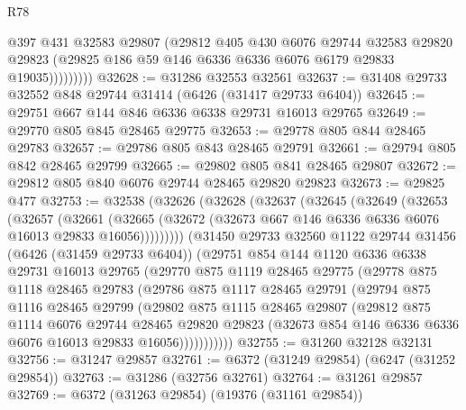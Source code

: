 \begin{lexlean}{R78}
\begin{coremodule}
                  @397
                  @431
                  @32583
                  @29807
                  (@29812
                    @405
                    @430
                    @6076
                    @29744
                    @32583
                    @29820
                    @29823
                    (@29825 @186 @59 @146 @6336 @6336 @6076 @6179 @29833 @19035)))))))))
@32628 := @31286 @32553 @32561
@32637 := @31408 @29733 @32552 @848 @29744 @31414 (@6426 (@31417 @29733 @6404))
@32645 := @29751 @667 @144 @846 @6336 @6338 @29731 @16013 @29765
@32649 := @29770 @805 @845 @28465 @29775
@32653 := @29778 @805 @844 @28465 @29783
@32657 := @29786 @805 @843 @28465 @29791
@32661 := @29794 @805 @842 @28465 @29799
@32665 := @29802 @805 @841 @28465 @29807
@32672 := @29812 @805 @840 @6076 @29744 @28465 @29820 @29823
@32673 := @29825 @477
@32753 := @32538
    (@32626
      (@32628
        (@32637
          (@32645
            (@32649
              (@32653
                (@32657
                  (@32661
                    (@32665
                      (@32672 (@32673 @667 @146 @6336 @6336 @6076 @16013 @29833 @16056)))))))))
        (@31450
          @29733
          @32560
          @1122
          @29744
          @31456
          (@6426 (@31459 @29733 @6404))
          (@29751
            @854
            @144
            @1120
            @6336
            @6338
            @29731
            @16013
            @29765
            (@29770
              @875
              @1119
              @28465
              @29775
              (@29778
                @875
                @1118
                @28465
                @29783
                (@29786
                  @875
                  @1117
                  @28465
                  @29791
                  (@29794
                    @875
                    @1116
                    @28465
                    @29799
                    (@29802
                      @875
                      @1115
                      @28465
                      @29807
                      (@29812
                        @875
                        @1114
                        @6076
                        @29744
                        @28465
                        @29820
                        @29823
                        (@32673 @854 @146 @6336 @6336 @6076 @16013 @29833 @16056)))))))))))
@32755 := @31260 @32128 @32131
@32756 := @31247 @29857
@32761 := @6372 (@31249 @29854) (@6247 (@31252 @29854))
@32763 := @31286 (@32756 @32761)
@32764 := @31261 @29857
@32769 := @6372 (@31263 @29854) (@19376 (@31161 @29854))

\end{coremodule}
\end{lexlean}
